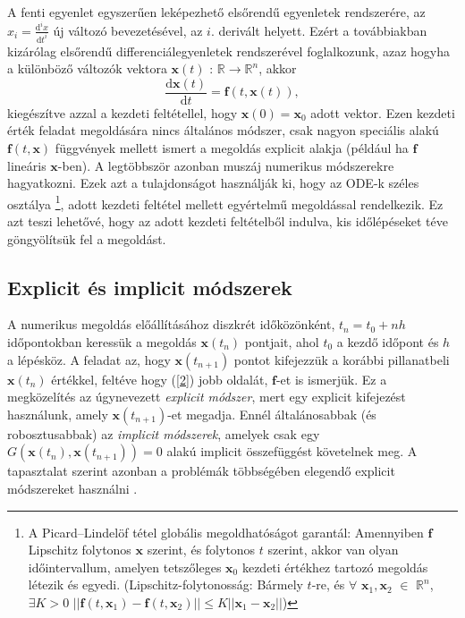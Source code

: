 \documentclass[12pt]{article}
\theoremstyle{plain}
\newcommand{\xvec}{\mathbf{x}}
\begin{document}
A fenti egyenlet egyszerűen leképezhető elsőrendű egyenletek rendszerére, az $x_i = \frac{\text{d}^ix}{\text{d}t^i}$ új változó bevezetésével, az $i$. derivált helyett. Ezért a továbbiakban kizárólag elsőrendű differenciálegyenletek rendszerével foglalkozunk, azaz hogyha a különböző változók vektora $\xvec(t)$ : $\mathbb{R} \to \mathbb{R}^n$, akkor
\begin{equation}
    \label{2}
    \frac{\text{d} \xvec(t)}{\text{d}t} = \mathbf{f}(t, \xvec(t)), 
\end{equation}
kiegészítve azzal a kezdeti feltétellel, hogy $\xvec(0) = \xvec_0$ adott vektor. Ezen kezdeti érték feladat megoldására nincs általános módszer, csak nagyon speciális alakú $\mathbf{f}(t, \xvec)$ függvények mellett ismert a megoldás explicit alakja (például ha $\mathbf{f}$ lineáris $\xvec$-ben). A legtöbbször azonban muszáj numerikus módszerekre hagyatkozni. Ezek azt a tulajdonságot használják ki, hogy az ODE-k széles osztálya \footnote{A Picard–Lindelöf tétel\cite{ode} globális megoldhatóságot garantál: Amennyiben $\mathbf{f}$ Lipschitz folytonos $\xvec$ szerint, és folytonos $t$ szerint, akkor van olyan időintervallum, amelyen tetszőleges $\xvec_0$ kezdeti értékhez tartozó megoldás létezik és egyedi. (Lipschitz-folytonosság: Bármely $t$-re, és $\forall$ $\xvec_1, \xvec_2$ $\in$ $\mathbb{R}^n$, $\exists K>0$ $||\mathbf{f}(t,\xvec_1) -\mathbf{f}(t, \xvec_2)||\leq K||\xvec_1 - \xvec_2||$)}, adott kezdeti feltétel mellett egyértelmű megoldással rendelkezik. Ez azt teszi lehetővé, hogy az adott kezdeti feltételből indulva, kis időlépéseket téve göngyölítsük fel a megoldást. 
\subsection{Explicit és implicit módszerek}
A numerikus megoldás előállításához diszkrét időközönként, $t_n = t_0 + nh$ időpontokban keressük a megoldás $\xvec(t_n)$ pontjait, ahol $t_0$ a kezdő időpont és $h$ a lépésköz. 
A feladat az, hogy $\xvec(t_{n+1})$ pontot kifejezzük a korábbi pillanatbeli $\xvec(t_n)$ értékkel, feltéve hogy (\ref{2}) jobb oldalát, $\mathbf{f}$-et is ismerjük. Ez a megközelítés az úgynevezett {\em explicit módszer}, mert egy explicit kifejezést használunk, amely $\xvec(t_{n+1})$-et megadja. Ennél általánosabbak (és robosztusabbak) az {\em implicit módszerek}, amelyek csak egy $G(\xvec(t_n), \xvec(t_{n+1}))=0$ alakú implicit összefüggést követelnek meg. A tapasztalat szerint azonban a problémák többségében elegendő explicit módszereket használni \cite{landau, tel}.
\end{document}
